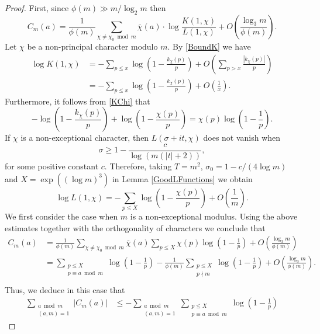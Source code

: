 \documentclass[12pt]{amsart}
\theoremstyle{definition}
\numberwithin{equation}{section}
\begin{document}
\begin{proof}
First, since $\phi(m)\gg m/\log_2m$ then 
$$
C_m(a)=\frac{1}{\phi(m)}\sum_{\chi\neq \chi_0 \bmod m} \overline{\chi}(a) \cdot \log \frac{K(1, \chi)}{L(1, \chi)}+O\left(\frac{\log_3 m}{\phi(m)}\right).
$$
Let $\chi$ be a non-principal character modulo $m$. By \eqref{BoundK} we have
\begin{align*}
\log K(1, \chi)&= -\sum_{p\leq x} \log\left(1-\frac{k_{\chi}(p)}{p}\right) +O\left(\sum_{p>x}\frac{|k_{\chi}(p)|}{p}\right)\\
&= -\sum_{p\leq x} \log\left(1-\frac{k_{\chi}(p)}{p}\right) +O\left(\frac 1x\right).
\end{align*}
Furthermore, it follows from \eqref{KChi} that
$$-\log\left(1-\frac{k_{\chi}(p)}{p}\right)+\log \left(1-\frac{\chi(p)}{p}\right)= \chi(p)\log \left(1-\frac{1}{p}\right).$$
If $\chi$ is a non-exceptional character, then $L(\sigma+it, \chi)$ does not vanish when
$$ \sigma\geq 1-\frac{c}{\log(m(|t|+2))},$$
for some positive constant $c$. 
Therefore, taking $T=m^2$, $\sigma_0= 1- c/(4\log m)$ and $X=\exp((\log m)^{3})$ in Lemma \ref{GoodLFunctions} we obtain
\begin{equation}\label{LongApproxL1}
\log L(1,\chi)= -\sum_{p\leq X}\log\left(1-
\frac{\chi(p)}{p}\right) +O\left(\frac{1}{m}\right).
\end{equation}
 We first consider the case when $m$ is a non-exceptional modulus. Using the above estimates together with the orthogonality of characters we conclude that
\begin{equation}\label{OrthogonalityCM}
\begin{aligned}
C_m(a)&= \frac{1}{\phi(m)}\sum_{\chi\neq \chi_0 \bmod m} \overline{\chi}(a)\sum_{p\leq X}\chi(p)\log \left(1-\frac{1}{p}\right) +O\left(\frac{\log_3 m}{\phi(m)}\right)\\
&= \sum_{\substack{p\leq X\\ p\equiv a \bmod m}}\log \left(1-\frac{1}{p}\right)-\frac{1}{\phi(m)} \sum_{\substack{p\leq X \\ p\nmid m}}\log \left(1-\frac{1}{p}\right)+O\left(\frac{\log_3 m}{\phi(m)}\right).\\
\end{aligned}
\end{equation}
Thus, we deduce in this case that
\begin{align*}
\sum_{\substack{a \bmod m\\ (a,m)=1}} \left|C_m(a)\right|
&\leq 
- \sum_{\substack{a \bmod m\\ (a,m)=1}} \sum_{\substack{p\leq X\\ p\equiv a \bmod m}}\log \left(1-\frac{1}{p}\right)

\end{align*}
\end{proof}
\end{document}
